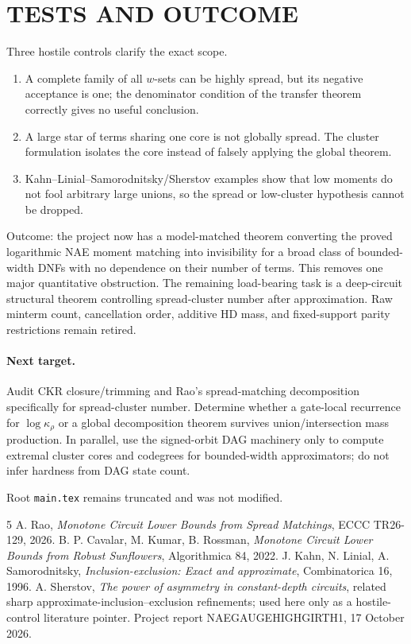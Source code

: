 \documentclass[11pt]{article}
\begin{document}
\section{TESTS AND OUTCOME}
Three hostile controls clarify the exact scope.
\begin{enumerate}
\item A complete family of all $w$-sets can be highly spread, but its negative acceptance is one; the denominator condition of the transfer theorem correctly gives no useful conclusion.
\item A large star of terms sharing one core is not globally spread. The cluster formulation isolates the core instead of falsely applying the global theorem.
\item Kahn--Linial--Samorodnitsky/Sherstov examples show that low moments do not fool arbitrary large unions, so the spread or low-cluster hypothesis cannot be dropped.
\end{enumerate}

Outcome: the project now has a model-matched theorem converting the proved logarithmic NAE moment matching into invisibility for a broad class of bounded-width DNFs with no dependence on their number of terms. This removes one major quantitative obstruction. The remaining load-bearing task is a deep-circuit structural theorem controlling spread-cluster number after approximation. Raw minterm count, cancellation order, additive HD mass, and fixed-support parity restrictions remain retired.

\paragraph{Next target.}
Audit CKR closure/trimming and Rao's spread-matching decomposition specifically for spread-cluster number. Determine whether a gate-local recurrence for $\log\kappa_\rho$ or a global decomposition theorem survives union/intersection mass production. In parallel, use the signed-orbit DAG machinery only to compute extremal cluster cores and codegrees for bounded-width approximators; do not infer hardness from DAG state count.

Root \texttt{main.tex} remains truncated and was not modified.

\begin{thebibliography}{5}
 A. Rao, \emph{Monotone Circuit Lower Bounds from Spread Matchings}, ECCC TR26-129, 2026.
 B. P. Cavalar, M. Kumar, B. Rossman, \emph{Monotone Circuit Lower Bounds from Robust Sunflowers}, Algorithmica 84, 2022.
 J. Kahn, N. Linial, A. Samorodnitsky, \emph{Inclusion-exclusion: Exact and approximate}, Combinatorica 16, 1996.
 A. Sherstov, \emph{The power of asymmetry in constant-depth circuits}, related sharp approximate-inclusion--exclusion refinements; used here only as a hostile-control literature pointer.
 Project report NAEGAUGEHIGHGIRTH1, 17 October 2026.
\end{thebibliography}
\end{document}
